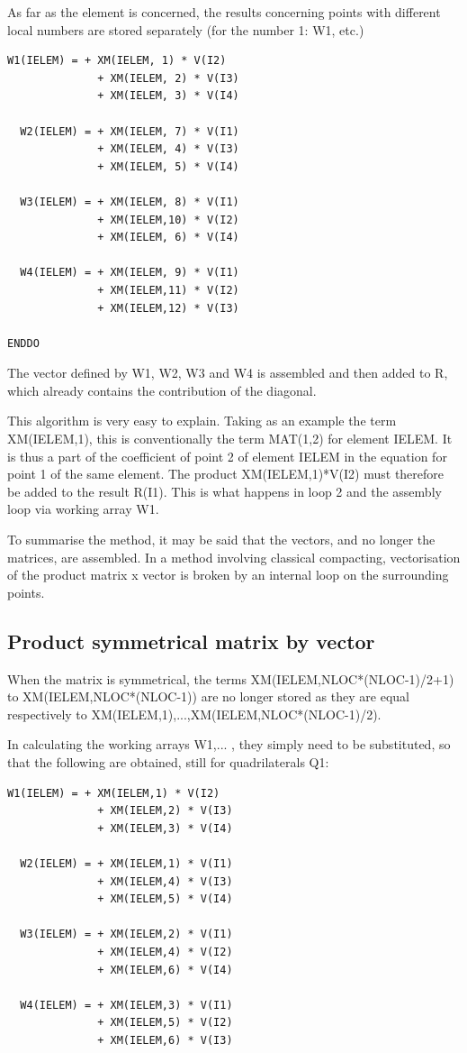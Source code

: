As far as the element is concerned, the results concerning points with different local numbers are stored separately (for the number 1: W1,  etc.)

\begin{lstlisting}[language=TelFortran]
  W1(IELEM) = + XM(IELEM, 1) * V(I2)
              + XM(IELEM, 2) * V(I3)
              + XM(IELEM, 3) * V(I4)

  W2(IELEM) = + XM(IELEM, 7) * V(I1)
              + XM(IELEM, 4) * V(I3)
              + XM(IELEM, 5) * V(I4)

  W3(IELEM) = + XM(IELEM, 8) * V(I1)
              + XM(IELEM,10) * V(I2)
              + XM(IELEM, 6) * V(I4)

  W4(IELEM) = + XM(IELEM, 9) * V(I1)
              + XM(IELEM,11) * V(I2)
              + XM(IELEM,12) * V(I3)

ENDDO
\end{lstlisting}

The vector defined by W1, W2, W3 and W4 is assembled and then added to R, which
already contains the contribution of the diagonal.

This algorithm is very easy to explain. Taking as an example the term
XM(IELEM,1), this is conventionally the term MAT(1,2) for element IELEM. It is
thus a part of the coefficient of point 2 of element IELEM in the equation for
point 1 of the same element. The product XM(IELEM,1)*V(I2) must therefore be
added to the result R(I1). This is what happens in loop 2 and the assembly loop
via working array W1.

To summarise the method, it may be said that the vectors, and no longer the
matrices, are assembled. In a method involving classical compacting,
vectorisation of the product matrix x vector is broken by an internal loop on
the surrounding points.

\subsection{Product symmetrical matrix by vector}

When the matrix is symmetrical, the terms XM(IELEM,NLOC*(NLOC-1)/2+1) to
XM(IELEM,NLOC*(NLOC-1)) are no longer stored as they are equal respectively to
XM(IELEM,1),...,XM(IELEM,NLOC*(NLOC-1)/2).

In calculating the working arrays W1,... , they simply need to be substituted,
so that the following are obtained, still for quadrilaterals Q1:
\begin{lstlisting}[language=TelFortran]
  W1(IELEM) = + XM(IELEM,1) * V(I2)
              + XM(IELEM,2) * V(I3)
              + XM(IELEM,3) * V(I4)

  W2(IELEM) = + XM(IELEM,1) * V(I1)
              + XM(IELEM,4) * V(I3)
              + XM(IELEM,5) * V(I4)

  W3(IELEM) = + XM(IELEM,2) * V(I1)
              + XM(IELEM,4) * V(I2)
              + XM(IELEM,6) * V(I4)

  W4(IELEM) = + XM(IELEM,3) * V(I1)
              + XM(IELEM,5) * V(I2)
              + XM(IELEM,6) * V(I3)
\end{lstlisting}

